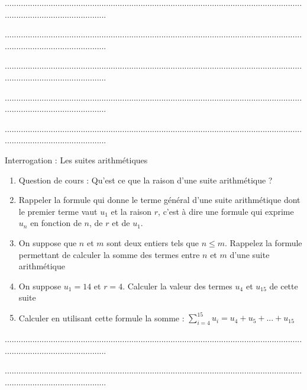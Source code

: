 \documentclass[10pt,a4paper]{exam}
\begin{document}
.............................................................................................................................................................................

.............................................................................................................................................................................
 
.............................................................................................................................................................................

.............................................................................................................................................................................


.............................................................................................................................................................................

\newpage


Interrogation : Les suites arithmétiques
\begin{enumerate}
    \item Question de cours : Qu'est ce que la raison d'une suite arithmétique ?
    \item Rappeler la formule qui donne le terme général d'une suite arithmétique dont le premier terme vaut $u_1$ et la raison $r$, c'est à dire une formule qui exprime $u_n$ en fonction de $n$, de $r$ et de $u_1$.
    \item On suppose que $n$ et $m$ sont deux entiers tels que $n\leq m$.  Rappelez la formule permettant de calculer la somme des termes entre $n$ et $m$ d'une suite arithmétique
    \item On suppose $u_1 = 14$ et $r = 4$.  Calculer la valeur des termes $u_4$ et $u_{15}$ de cette suite
    \item Calculer en utilisant cette formule la somme :  $\sum_{i=4}^{15} u_i = u_4 + u_5 + ... + u_{15}$
\end{enumerate}

\vspace{10mm}

.............................................................................................................................................................................

.............................................................................................................................................................................
 
\end{document}
